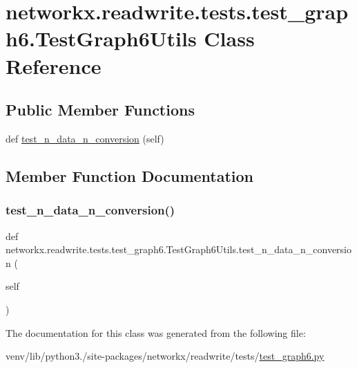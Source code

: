 \hypertarget{classnetworkx_1_1readwrite_1_1tests_1_1test__graph6_1_1TestGraph6Utils}{}\section{networkx.\+readwrite.\+tests.\+test\+\_\+graph6.\+Test\+Graph6\+Utils Class Reference}
\label{classnetworkx_1_1readwrite_1_1tests_1_1test__graph6_1_1TestGraph6Utils}
\subsection*{Public Member Functions}
\begin{DoxyCompactItemize}
\item 
def \hyperlink{classnetworkx_1_1readwrite_1_1tests_1_1test__graph6_1_1TestGraph6Utils_a05818dc0801abe5578c4e48a36673272}{test\+\_\+n\+\_\+data\+\_\+n\+\_\+conversion} (self)
\end{DoxyCompactItemize}


\subsection{Member Function Documentation}
\mbox{\label{classnetworkx_1_1readwrite_1_1tests_1_1test__graph6_1_1TestGraph6Utils_a05818dc0801abe5578c4e48a36673272}} 
\subsubsection{\texorpdfstring{test\+\_\+n\+\_\+data\+\_\+n\+\_\+conversion()}{test\_n\_data\_n\_conversion()}}
{\footnotesize\ttfamily def networkx.\+readwrite.\+tests.\+test\+\_\+graph6.\+Test\+Graph6\+Utils.\+test\+\_\+n\+\_\+data\+\_\+n\+\_\+conversion (\begin{DoxyParamCaption}\item[{}]{self }\end{DoxyParamCaption})}



The documentation for this class was generated from the following file\+:\begin{DoxyCompactItemize}
\item 
venv/lib/python3./site-\/packages/networkx/readwrite/tests/\hyperlink{test__graph6_8py}{test\+\_\+graph6.\+py}\end{DoxyCompactItemize}
